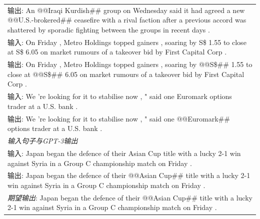 \documentclass[supercite]{Experimental_Report}
\theoremstyle{definition}
\begin{document}
\begin{table}[th!]
{\begin{tabular}{l}
输出: An @@Iraqi Kurdish\#\# group on Wednesday said it had agreed a new @@U.S.-brokered\#\# ceasefire with a rival faction after a previous accord was shattered by sporadic fighting between the groups in recent days . \\
输入: On Friday , Metro Holdings topped gainers , soaring by S\$ 1.55 to close at S\$ 6.05 on market rumours of a takeover bid by First Capital Corp . \\
输出: On Friday , Metro Holdings topped gainers , soaring by @@S\$\#\# 1.55 to close at @@S\$\#\# 6.05 on market rumours of a takeover bid by First Capital Corp . \\
输入: We 're looking for it to stabilise now , " said one Euromark options trader at a U.S. bank . \\
输出: We 're looking for it to stabilise now , " said one @@Euromark\#\# options trader at a U.S. bank . \\\midrule
\textit{输入句子与GPT-3输出} \\
输入: Japan began the defence of their Asian Cup title with a lucky 2-1 win against Syria in a Group C championship match on Friday . \\
输出: Japan began the defence of their @@Asian Cup\#\# title with a lucky 2-1 win against Syria in a Group C championship match on Friday .\\
{\color{blue}\it 期望输出}: Japan began the defence of their @@Asian Cup\#\# title with a lucky 2-1 win against Syria in a Group C championship match on Friday . \\\bottomrule


\end{tabular}}
\end{table}
\end{document}
